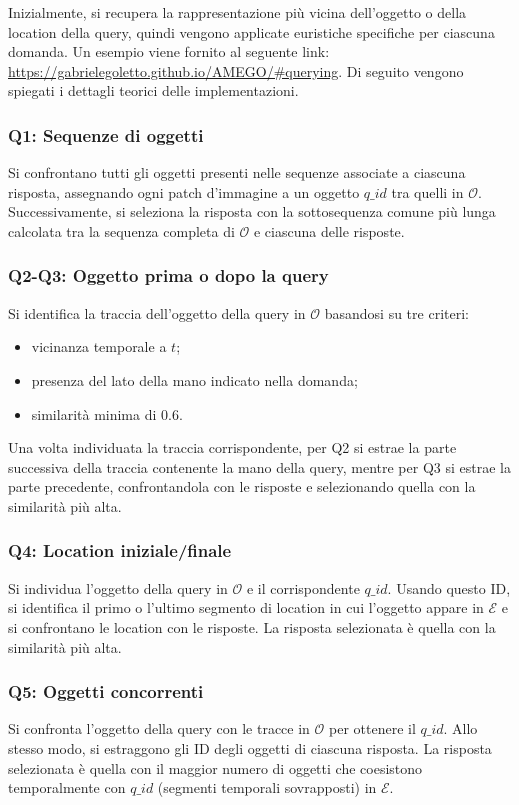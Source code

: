 Inizialmente, si recupera la rappresentazione più vicina dell'oggetto o della location della query, quindi vengono applicate euristiche specifiche per ciascuna domanda. Un esempio viene fornito al seguente link: \url{https://gabrielegoletto.github.io/AMEGO/#querying}.  
Di seguito vengono spiegati i dettagli teorici delle implementazioni.

\subsubsection*{Q1: Sequenze di oggetti}
Si confrontano tutti gli oggetti presenti nelle sequenze associate a ciascuna risposta, assegnando ogni patch d'immagine a un oggetto $q\_id$ tra quelli in $\mathcal{O}$. Successivamente, si seleziona la risposta con la sottosequenza comune più lunga calcolata tra la sequenza completa di $\mathcal{O}$ e ciascuna delle risposte.

\subsubsection*{Q2-Q3: Oggetto prima o dopo la query}
Si identifica la traccia dell'oggetto della query in $\mathcal{O}$ basandosi su tre criteri:
\begin{itemize}
    \item vicinanza temporale a $t$;
    \item presenza del lato della mano indicato nella domanda;
    \item similarità minima di 0.6.
\end{itemize}
Una volta individuata la traccia corrispondente, per Q2 si estrae la parte successiva della traccia contenente la mano della query, mentre per Q3 si estrae la parte precedente, confrontandola con le risposte e selezionando quella con la similarità più alta.

\subsubsection*{Q4: Location iniziale/finale}
Si individua l'oggetto della query in $\mathcal{O}$ e il corrispondente $q\_id$. Usando questo ID, si identifica il primo o l'ultimo segmento di location in cui l'oggetto appare in $\mathcal{E}$ e si confrontano le location con le risposte. La risposta selezionata è quella con la similarità più alta.

\subsubsection*{Q5: Oggetti concorrenti}
Si confronta l'oggetto della query con le tracce in $\mathcal{O}$ per ottenere il $q\_id$. Allo stesso modo, si estraggono gli ID degli oggetti di ciascuna risposta. La risposta selezionata è quella con il maggior numero di oggetti che coesistono temporalmente con $q\_id$ (segmenti temporali sovrapposti) in $\mathcal{E}$.

